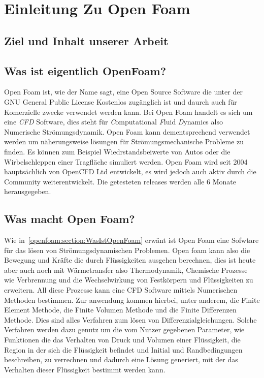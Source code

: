 %
%
%
%
\section{Einleitung Zu Open Foam\label{openfoam:section:Einleitung}}
\subsection{Ziel und Inhalt unserer Arbeit}

\subsection{Was ist eigentlich OpenFoam?\label{openfoam:section:WasIstOpenFoam}}
Open Foam ist, wie der Name sagt, eine Open Source Software die unter der GNU
General Public License Kostenlos zugänglich ist und daurch auch für Komerzielle zwecke 
verwendet werden kann. 
Bei Open Foam handelt es sich um eine \emph{CFD} Software, 
dies steht für \emph{C}omputational \emph{F}luid \emph{D}ynamics also Numerische Strömungsdynamik.
Open Foam kann dementsprechend verwendet werden um näherungsweise lösungen für 
Strömungsmechanische Probleme zu finden.
Es können zum Beispiel Wiedrstandsbeiwerte von Autos oder die Wirbelschleppen einer Tragfläche simuliert werden.
Open Foam wird seit 2004 hauptsächlich von OpenCFD Ltd entwickelt, es wird jedoch auch aktiv durch die Community weiterentwickelt.
Die getesteten releases werden alle 6 Monate herausgegeben.~\cite{openfoam:greenshieldsweller2022}
\subsection{Was macht Open Foam?}
Wie in~\ref{openfoam:section:WasIstOpenFoam} erwänt ist Open Foam eine Sofwtare für das lösen von Strömungsdynamischen Problemen.
Open foam kann also die Bewegung und Kräfte die durch Flüssigkeiten ausgehen berechnen, 
dies ist heute aber auch noch mit Wärmetransfer also Thermodynamik, Chemische Prozesse wie Verbrennung
und die Wechselwirkung von Festkörpern und Flüssigkeiten zu erweitern. 
All diese Prozesse kann eine CFD Software mittels Numerischen Methoden bestimmen. 
Zur anwendung kommen hierbei, unter anderem, die Finite Element Methode, die Finite Volumen Methode und die Finite Differenzen Methode.
Dies sind alles Verfahren zum lösen von Differenzialgleichungen.
Solche Verfahren werden dazu genutz um die vom Nutzer gegebenen Parameter, wie Funktionen die das Verhalten von Druck und Volumen einer Flüssigkeit,
die Region in der sich die Flüssigkeit befindet und Initial und Randbedingungen beschreiben, zu verrechnen und dadurch eine Lösung generiert, 
mit der das Verhalten dieser Flüssigkeit bestimmt werden kann.
~\cite{openfoam:greenshieldsweller2022}